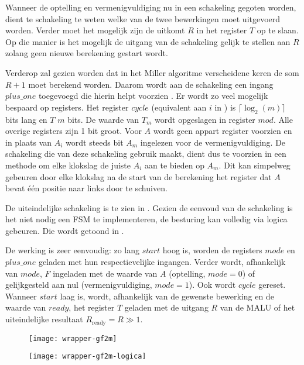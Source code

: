Wanneer de optelling en vermenigvuldiging nu in een schakeling gegoten worden, dient te schakeling te weten welke van de twee bewerkingen moet uitgevoerd worden. Verder moet het mogelijk zijn de uitkomt $R$ in het register $T$ op te slaan. Op die manier is het mogelijk de uitgang van de schakeling gelijk te stellen aan $R$ zolang geen nieuwe berekening gestart wordt.  

Verderop zal gezien worden dat in het Miller algoritme verscheidene keren de som $R + 1$ moet berekend worden. Daarom wordt aan de schakeling een ingang $plus\_one$ toegevoegd die hierin helpt voorzien	. Er wordt zo veel mogelijk bespaard op registers. Het register $cycle$ (equivalent aan $i$ in ) is $\lceil \log _2 (m) \rceil$ bits lang en $T$ $m$ bits. De waarde van $T_m$ wordt opgeslagen in register $mod$.  Alle overige registers zijn 1 bit groot. Voor $A$ wordt geen appart register voorzien en in plaats van $A_i$ wordt steeds bit $A_m$ ingelezen voor de vermenigvuldiging. De schakeling die van deze schakeling gebruik maakt, dient dus te voorzien in een methode om elke klokslag de juiste $A_i$ aan te bieden op $A_m$. Dit kan simpelweg gebeuren door elke klokslag na de start van de berekening het register dat $A$ bevat \'e\'en positie naar links door te schuiven.

 De uiteindelijke schakeling is te zien in . Gezien de eenvoud van de schakeling is het niet nodig een FSM te implementeren, de besturing kan volledig via logica gebeuren. Die wordt getoond in .

De werking is zeer eenvoudig: zo lang $start$ hoog is, worden de registers $mode$ en $plus\_one$ geladen met hun respectievelijke ingangen. Verder wordt, afhankelijk van $mode$, $F$ ingeladen met de waarde van $A$ (optelling, $mode = 0$) of gelijkgesteld aan nul (vermenigvuldiging, $mode = 1$). Ook wordt $cycle$ gereset. Wanneer $start$ laag is, wordt, afhankelijk van de gewenste bewerking en de waarde van $ready$, het register $T$ geladen met de uitgang $R$ van de MALU of het uiteindelijke resultaat $R_{\text{ready}} = R \gg 1$.

\begin{figure}[h]
	\centering
		\texttt{[image: wrapper-gf2m]}
		\label{figuur-implementatie-wrapper-gf2m}
\end{figure}

\begin{figure}[h]
	\centering
		\texttt{[image: wrapper-gf2m-logica]}
		\label{figuur-implementatie-wrapper-gf2m-logica}
\end{figure}

